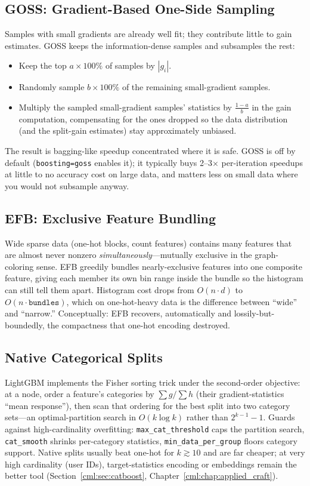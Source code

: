 \subsection{GOSS: Gradient-Based One-Side Sampling}

Samples with small gradients are already well fit; they contribute little to gain estimates. GOSS keeps the information-dense samples and subsamples the rest:
\begin{itemize}
    \item Keep the top $a \times 100\%$ of samples by $|g_i|$.
    \item Randomly sample $b \times 100\%$ of the remaining small-gradient samples.
    \item Multiply the sampled small-gradient samples' statistics by $\frac{1-a}{b}$ in the gain computation, compensating for the ones dropped so the data distribution (and the split-gain estimates) stay approximately unbiased.
\end{itemize}
The result is bagging-like speedup concentrated where it is safe. GOSS is off by default (\texttt{boosting=goss} enables it); it typically buys 2--3$\times$ per-iteration speedups at little to no accuracy cost on large data, and matters less on small data where you would not subsample anyway.

\subsection{EFB: Exclusive Feature Bundling}

Wide sparse data (one-hot blocks, count features) contains many features that are almost never nonzero \textit{simultaneously}---mutually exclusive in the graph-coloring sense. EFB greedily bundles nearly-exclusive features into one composite feature, giving each member its own bin range inside the bundle so the histogram can still tell them apart. Histogram cost drops from $O(n \cdot d)$ to $O(n \cdot \texttt{bundles})$, which on one-hot-heavy data is the difference between ``wide'' and ``narrow.'' Conceptually: EFB recovers, automatically and lossily-but-boundedly, the compactness that one-hot encoding destroyed.

\subsection{Native Categorical Splits}

LightGBM implements the Fisher sorting trick under the second-order objective: at a node, order a feature's categories by $\sum g / \sum h$ (their gradient-statistics ``mean response''), then scan that ordering for the best split into two category sets---an optimal-partition search in $O(k \log k)$ rather than $2^{k-1}-1$. Guards against high-cardinality overfitting: \texttt{max\_cat\_threshold} caps the partition search, \texttt{cat\_smooth} shrinks per-category statistics, \texttt{min\_data\_per\_group} floors category support. Native splits usually beat one-hot for $k \gtrsim 10$ and are far cheaper; at very high cardinality (user IDs), target-statistics encoding or embeddings remain the better tool (Section~\ref{cml:sec:catboost}, Chapter~\ref{cml:chap:applied_craft}).

